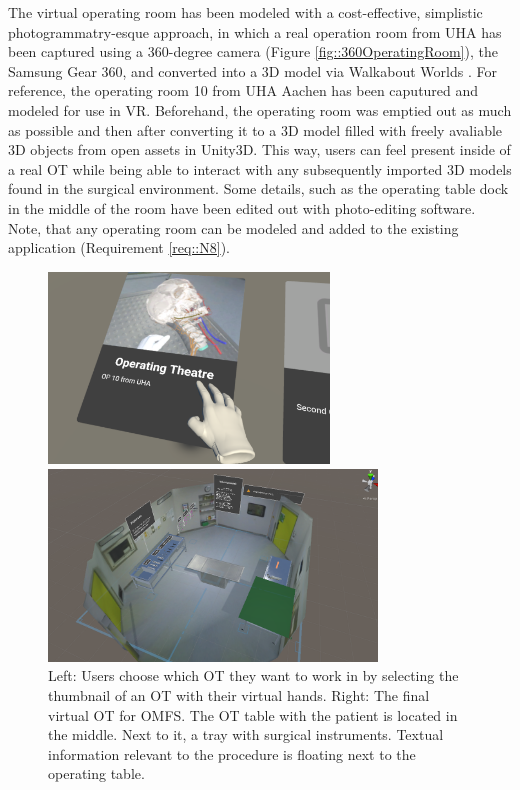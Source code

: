 The virtual operating room has been modeled with a cost-effective, simplistic photogrammatry-esque approach, in which a real operation room from UHA has been captured using a 
360-degree camera (Figure \ref{fig::360OperatingRoom}), the Samsung Gear 360, and converted into a 3D model via Walkabout Worlds \cite{WalkaboutWorlds}.
For reference, the operating room 10 from UHA Aachen has been caputured and modeled for use in VR.
Beforehand, the operating room was emptied out as much as possible and then after converting it to a 3D model filled with freely avaliable 3D objects from open assets in Unity3D.
This way, users can feel present inside of a real OT while being able to interact with any subsequently imported 3D models found in the surgical environment.
Some details, such as the operating table dock in the middle of the room have been edited out with photo-editing software.
Note, that any operating room can be modeled and added to the existing application (Requirement \ref{req::N8}).


\begin{figure}[ht]
  \centering
  \begin{minipage}{.5\textwidth}
    \centering
    \includegraphics[width=0.99\linewidth, height=5.1cm]{images/implementation/vot/select_op.png}
  \end{minipage}%
  \begin{minipage}{.5\textwidth}
    \centering
    \includegraphics[width=0.99\linewidth, height=5.1cm]{images/implementation/vot/overview.png}
  \end{minipage}
  \caption{\label{fig::SceneSelect} Left: Users choose which OT they want to work in by selecting the thumbnail of an OT with their virtual hands. Right: The final virtual OT for OMFS. 
  The OT table with the patient is located in the middle. Next to it, a tray with surgical instruments.
  Textual information relevant to the procedure is floating next to the operating table.}
\end{figure}


